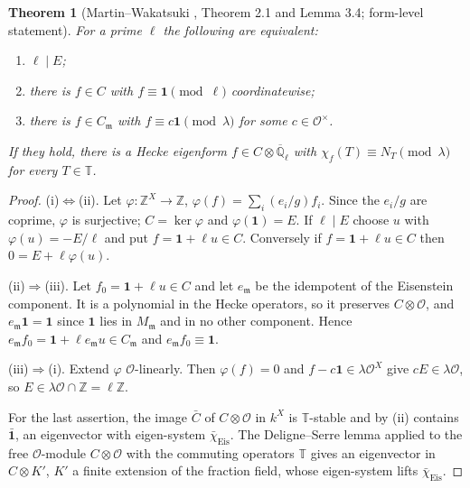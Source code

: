 \documentclass[11pt]{amsart}
\newtheorem{theorem}{Theorem}[section]
\theoremstyle{definition}
\newcommand{\Z}{\mathbb{Z}}\newcommand{\Q}{\mathbb{Q}}\newcommand{\R}{\mathbb{R}}\newcommand{\A}{\mathbb{A}}\newcommand{\F}{\mathbb{F}}
\newcommand{\T}{\mathbb{T}}\newcommand{\Tr}{\operatorname{Tr}}\newcommand{\Aut}{\operatorname{Aut}}\newcommand{\Stab}{\operatorname{Stab}}
\newcommand{\Eis}{\mathrm{Eis}}\newcommand{\Gt}{G_2}\newcommand{\Ff}{F_4}
\begin{document}
\begin{theorem}[Martin--Wakatsuki \cite{MW24}, Theorem 2.1 and Lemma 3.4; form-level statement]\label{thm:exist}
For a prime $\ell$ the following are equivalent:
\begin{enumerate}
\item[(i)] $\ell\mid E$;
\item[(ii)] there is $f\in C$ with $f\equiv\mathbf 1\pmod\ell$ coordinatewise;
\item[(iii)] there is $f\in C_{\mathfrak m}$ with $f\equiv c\mathbf 1\pmod\lambda$ for some $c\in\mathcal O^\times$.
\end{enumerate}
If they hold, there is a Hecke eigenform $f\in C\otimes\overline{\Q}_\ell$ with $\chi_f(T)\equiv N_T\pmod\lambda$ for every $T\in\T$.
\end{theorem}
\begin{proof}
(i)$\Leftrightarrow$(ii). Let $\varphi:\Z^X\to\Z$, $\varphi(f)=\sum_i(e_i/g)f_i$. Since the $e_i/g$ are coprime, $\varphi$ is surjective; $C=\ker\varphi$ and $\varphi(\mathbf 1)=E$. If $\ell\mid E$ choose $u$ with $\varphi(u)=-E/\ell$ and put $f=\mathbf 1+\ell u\in C$. Conversely if $f=\mathbf 1+\ell u\in C$ then $0=E+\ell\varphi(u)$.

(ii)$\Rightarrow$(iii). Let $f_0=\mathbf 1+\ell u\in C$ and let $e_{\mathfrak m}$ be the idempotent of the Eisenstein component. It is a polynomial in the Hecke operators, so it preserves $C\otimes\mathcal O$, and $e_{\mathfrak m}\mathbf 1=\mathbf 1$ since $\mathbf 1$ lies in $M_{\mathfrak m}$ and in no other component. Hence $e_{\mathfrak m}f_0=\mathbf 1+\ell e_{\mathfrak m}u\in C_{\mathfrak m}$ and $e_{\mathfrak m}f_0\equiv\mathbf 1$.

(iii)$\Rightarrow$(i). Extend $\varphi$ $\mathcal O$-linearly. Then $\varphi(f)=0$ and $f-c\mathbf 1\in\lambda\mathcal O^X$ give $cE\in\lambda\mathcal O$, so $E\in\lambda\mathcal O\cap\Z=\ell\Z$.

For the last assertion, the image $\bar C$ of $C\otimes\mathcal O$ in $k^X$ is $\T$-stable and by (ii) contains $\bar{\mathbf 1}$, an eigenvector with eigen-system $\bar\chi_{\Eis}$. The Deligne--Serre lemma \cite[Lemme 6.11]{DS} applied to the free $\mathcal O$-module $C\otimes\mathcal O$ with the commuting operators $\T$ gives an eigenvector in $C\otimes K'$, $K'$ a finite extension of the fraction field, whose eigen-system lifts $\bar\chi_{\Eis}$.
\end{proof}
\end{document}
